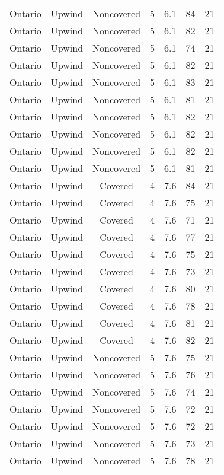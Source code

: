 \documentclass{article}
\begin{document}
\begin{longtable}[H]{ccccccc}
Ontario & Upwind   & Noncovered & 5 & 6.1  & 84  & 21 \\
Ontario & Upwind   & Noncovered & 5 & 6.1  & 82  & 21 \\
Ontario & Upwind   & Noncovered & 5 & 6.1  & 74  & 21 \\
Ontario & Upwind   & Noncovered & 5 & 6.1  & 82  & 21 \\
Ontario & Upwind   & Noncovered & 5 & 6.1  & 83  & 21 \\
Ontario & Upwind   & Noncovered & 5 & 6.1  & 81  & 21 \\
Ontario & Upwind   & Noncovered & 5 & 6.1  & 82  & 21 \\
Ontario & Upwind   & Noncovered & 5 & 6.1  & 82  & 21 \\
Ontario & Upwind   & Noncovered & 5 & 6.1  & 82  & 21 \\
Ontario & Upwind   & Noncovered & 5 & 6.1  & 81  & 21 \\
Ontario & Upwind   & Covered     & 4 & 7.6  & 84  & 21 \\
Ontario & Upwind   & Covered     & 4 & 7.6  & 75  & 21 \\
Ontario & Upwind   & Covered     & 4 & 7.6  & 71  & 21 \\
Ontario & Upwind   & Covered     & 4 & 7.6  & 77  & 21 \\
Ontario & Upwind   & Covered     & 4 & 7.6  & 75  & 21 \\
Ontario & Upwind   & Covered     & 4 & 7.6  & 73  & 21 \\
Ontario & Upwind   & Covered     & 4 & 7.6  & 80  & 21 \\
Ontario & Upwind   & Covered     & 4 & 7.6  & 78  & 21 \\
Ontario & Upwind   & Covered     & 4 & 7.6  & 81  & 21 \\
Ontario & Upwind   & Covered     & 4 & 7.6  & 82  & 21 \\
Ontario & Upwind   & Noncovered & 5 & 7.6  & 75  & 21 \\
Ontario & Upwind   & Noncovered & 5 & 7.6  & 76  & 21 \\
Ontario & Upwind   & Noncovered & 5 & 7.6  & 74  & 21 \\
Ontario & Upwind   & Noncovered & 5 & 7.6  & 72  & 21 \\
Ontario & Upwind   & Noncovered & 5 & 7.6  & 72  & 21 \\
Ontario & Upwind   & Noncovered & 5 & 7.6  & 73  & 21 \\
Ontario & Upwind   & Noncovered & 5 & 7.6  & 78  & 21 \\

\end{longtable}
\end{document}
